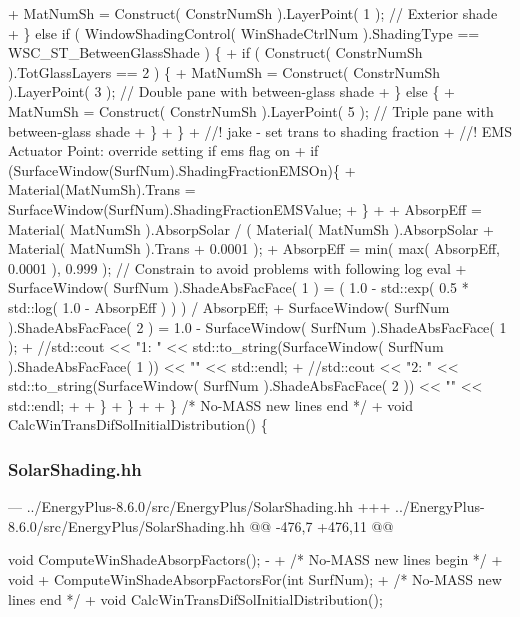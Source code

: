 \begin{DoxyCode}
+                   MatNumSh = Construct( ConstrNumSh ).LayerPoint( 1 ); // Exterior shade
+               \} else if ( WindowShadingControl( WinShadeCtrlNum ).ShadingType == WSC\_ST\_BetweenGlassShade
       ) \{
+                   if ( Construct( ConstrNumSh ).TotGlassLayers == 2 ) \{
+                       MatNumSh = Construct( ConstrNumSh ).LayerPoint( 3 ); // Double pane with
       between-glass shade
+                   \} else \{
+                       MatNumSh = Construct( ConstrNumSh ).LayerPoint( 5 ); // Triple pane with
       between-glass shade
+                   \}
+               \}
+               //! jake - set trans to shading fraction
+               //! EMS Actuator Point: override setting if ems flag on
+               if (SurfaceWindow(SurfNum).ShadingFractionEMSOn)\{
+                   Material(MatNumSh).Trans = SurfaceWindow(SurfNum).ShadingFractionEMSValue;
+               \}
+
+               AbsorpEff = Material( MatNumSh ).AbsorpSolar / ( Material( MatNumSh ).AbsorpSolar +
       Material( MatNumSh ).Trans + 0.0001 );
+               AbsorpEff = min( max( AbsorpEff, 0.0001 ), 0.999 ); // Constrain to avoid problems with
       following log eval
+               SurfaceWindow( SurfNum ).ShadeAbsFacFace( 1 ) = ( 1.0 - std::exp( 0.5 * std::log( 1.0 -
       AbsorpEff ) ) ) / AbsorpEff;
+               SurfaceWindow( SurfNum ).ShadeAbsFacFace( 2 ) = 1.0 - SurfaceWindow( SurfNum
       ).ShadeAbsFacFace( 1 );
+                //std::cout << "1: " <<  std::to\_string(SurfaceWindow( SurfNum ).ShadeAbsFacFace( 1 )) <<
       "" << std::endl;
+                //std::cout << "2: " <<  std::to\_string(SurfaceWindow( SurfNum ).ShadeAbsFacFace( 2 )) <<
       "" << std::endl;
+
+           \}
+       \}
+
+   \} /* No-MASS new lines end */
+
    void
    CalcWinTransDifSolInitialDistribution()
    \{
\end{DoxyCode}




 

\subsubsection*{Solar\+Shading.\+hh}




\begin{DoxyCode}
--- ../EnergyPlus-8.6.0/src/EnergyPlus/SolarShading.hh
+++ ../EnergyPlus-8.6.0/src/EnergyPlus/SolarShading.hh
@@ -476,7 +476,11 @@

    void
    ComputeWinShadeAbsorpFactors();
-
+   /* No-MASS new lines begin */
+   void 
+   ComputeWinShadeAbsorpFactorsFor(int SurfNum);
+   /* No-MASS new lines end */
+   
    void
    CalcWinTransDifSolInitialDistribution();
\end{DoxyCode}




